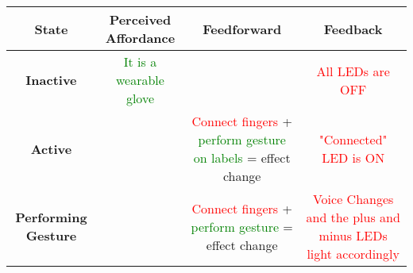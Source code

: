 \begin{center}
  \begin{tabular}{| c{2cm} | c{3cm} | c{3cm} | c{3cm} |}
    \hline
    \textbf{State} & \textbf{Perceived Affordance} & \textbf{Feedforward} & \textbf{Feedback} \\ \hline
    \textbf{Inactive} & \textcolor{green}{It is a wearable glove} & & \textcolor{red}{All LEDs are OFF} \\ \hline
    \textbf{Active} &  & \textcolor{red}{Connect fingers} + \textcolor{green}{perform gesture on labels} = effect change & \textcolor{red}{"Connected" LED is ON} \\ \hline        
    \textbf{Performing Gesture} &  & \textcolor{red}{Connect fingers} + \textcolor{green}{perform gesture} = effect change & \textcolor{red}{Voice Changes and the plus and minus LEDs light accordingly} \\ \hline
  \end{tabular}
\end{center}